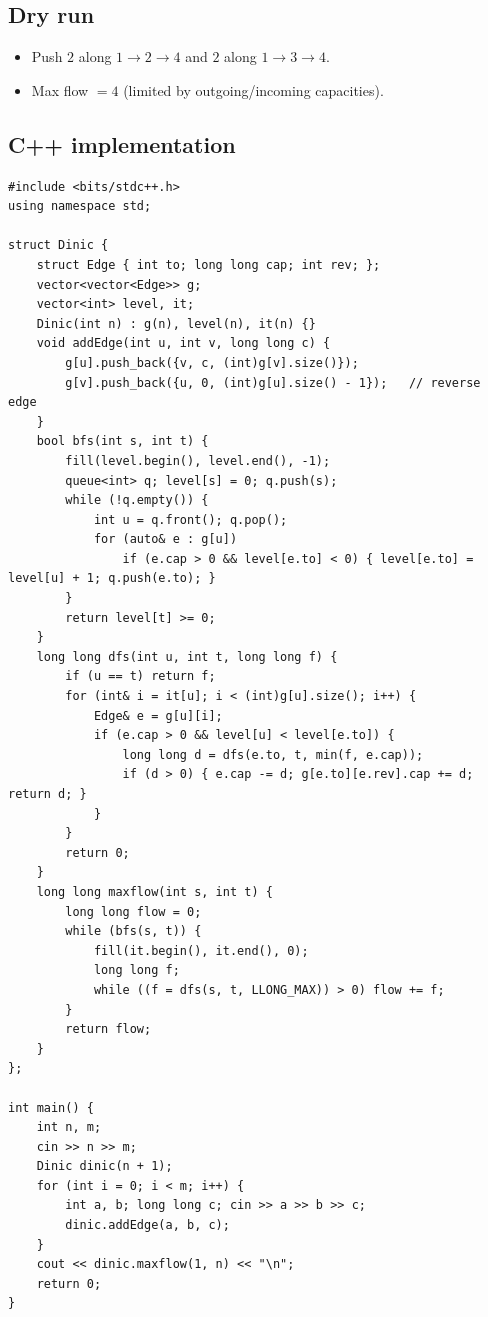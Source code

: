 \subsection*{Dry run}


\begin{itemize}
  \item Push $2$ along $1\!\to\!2\!\to\!4$ and $2$ along
        $1\!\to\!3\!\to\!4$.
  \item Max flow $=4$ (limited by outgoing/incoming capacities).
\end{itemize}

\subsection*{C++ implementation}

\begin{lstlisting}
#include <bits/stdc++.h>
using namespace std;

struct Dinic {
    struct Edge { int to; long long cap; int rev; };
    vector<vector<Edge>> g;
    vector<int> level, it;
    Dinic(int n) : g(n), level(n), it(n) {}
    void addEdge(int u, int v, long long c) {
        g[u].push_back({v, c, (int)g[v].size()});
        g[v].push_back({u, 0, (int)g[u].size() - 1});   // reverse edge
    }
    bool bfs(int s, int t) {
        fill(level.begin(), level.end(), -1);
        queue<int> q; level[s] = 0; q.push(s);
        while (!q.empty()) {
            int u = q.front(); q.pop();
            for (auto& e : g[u])
                if (e.cap > 0 && level[e.to] < 0) { level[e.to] = level[u] + 1; q.push(e.to); }
        }
        return level[t] >= 0;
    }
    long long dfs(int u, int t, long long f) {
        if (u == t) return f;
        for (int& i = it[u]; i < (int)g[u].size(); i++) {
            Edge& e = g[u][i];
            if (e.cap > 0 && level[u] < level[e.to]) {
                long long d = dfs(e.to, t, min(f, e.cap));
                if (d > 0) { e.cap -= d; g[e.to][e.rev].cap += d; return d; }
            }
        }
        return 0;
    }
    long long maxflow(int s, int t) {
        long long flow = 0;
        while (bfs(s, t)) {
            fill(it.begin(), it.end(), 0);
            long long f;
            while ((f = dfs(s, t, LLONG_MAX)) > 0) flow += f;
        }
        return flow;
    }
};

int main() {
    int n, m;
    cin >> n >> m;
    Dinic dinic(n + 1);
    for (int i = 0; i < m; i++) {
        int a, b; long long c; cin >> a >> b >> c;
        dinic.addEdge(a, b, c);
    }
    cout << dinic.maxflow(1, n) << "\n";
    return 0;
}
\end{lstlisting}

